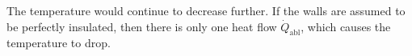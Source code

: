 The temperature would continue to decrease further. If the walls are assumed to be perfectly insulated, then there is only one heat flow \( \dot{Q}_{\text{abl}} \), which causes the temperature to drop.